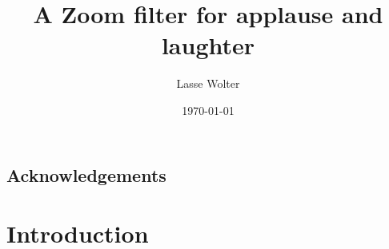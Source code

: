 \documentclass[bsc,frontabs,parskip,deptreport]{infthesis}
\begin{document}
\begin{preliminary}
\title{A Zoom filter for applause and laughter}

\author{Lasse Wolter}



\date{\today}

\abstract{

}

\maketitle

\section*{Acknowledgements}


\tableofcontents
\end{preliminary}



\chapter{Introduction}
\end{document}
